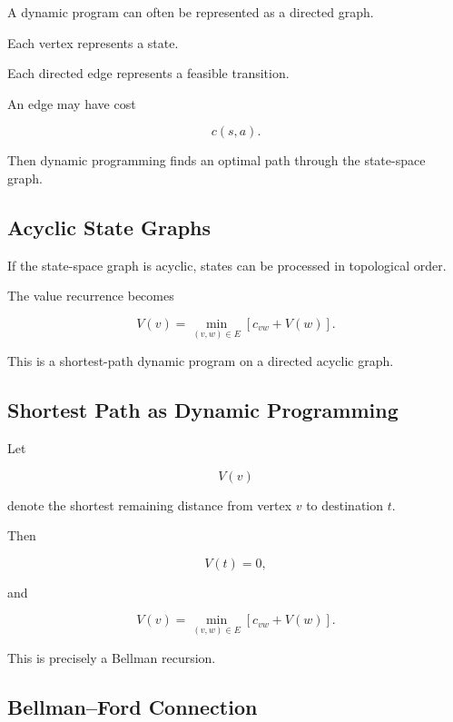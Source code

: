 A dynamic program can often be represented as a directed graph.

Each vertex represents a state.

Each directed edge represents a feasible transition.

An edge may have cost

\[
\boxed{
c(s,a).
}
\]

Then dynamic programming finds an optimal path through the state-space
graph.

\subsection{Acyclic State Graphs}
\label{subsec:acyclic-state-graphs}

If the state-space graph is acyclic, states can be processed in
topological order.

The value recurrence becomes

\[
\boxed{
V(v)
=
\min_{(v,w)\in E}
\left[
c_{vw}+V(w)
\right].
}
\]

This is a shortest-path dynamic program on a directed acyclic graph.

\subsection{Shortest Path as Dynamic Programming}
\label{subsec:shortest-path-dynamic-programming}

Let

\[
V(v)
\]

denote the shortest remaining distance from vertex \(v\) to destination
\(t\).

Then

\[
\boxed{
V(t)=0,
}
\]

and

\[
\boxed{
V(v)
=
\min_{(v,w)\in E}
\left[
c_{vw}+V(w)
\right].
}
\]

This is precisely a Bellman recursion.

\subsection{Bellman--Ford Connection}
\label{subsec:bellman-ford-dynamic-programming}

